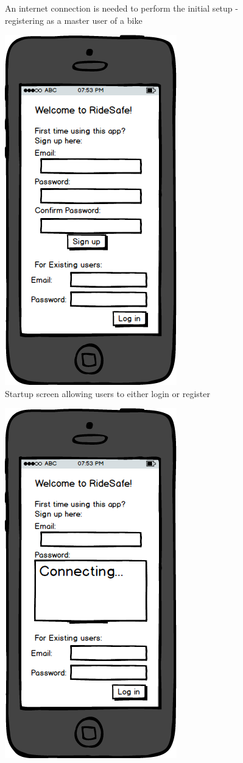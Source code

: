 \documentclass[a4paper]{report}
\begin{document}
{\begin{figure}
\caption{An internet connection is needed to perform the initial setup - registering as a master user of a bike}
\end{figure}
\clearpage
\begin{figure}
\centering
\includegraphics[scale=0.9]{figures/prototype_2/startup}
\caption{Startup screen allowing users to either login or register}
\end{figure}
\clearpage
\begin{figure}
\centering
\includegraphics[scale=0.9]{figures/prototype_2/connecting}

\end{figure}}
\end{document}
